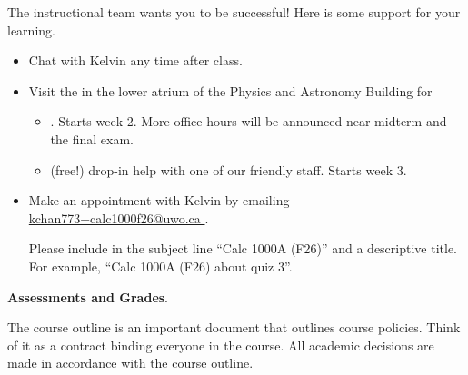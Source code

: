 \documentclass[../main.tex]{subfiles}
\begin{document}
\vfill{}

The instructional team wants you to be successful! Here is some support for your learning.
\begin{itemize}
  \item Chat with Kelvin any time after class.
  \item Visit the  in the lower atrium of the Physics and Astronomy Building for
    \begin{itemize}
      \item {}. Starts week 2. More office hours will be announced near midterm and the final exam.
      \item (free!) drop-in help with one of our friendly staff. Starts week 3.
    \end{itemize}
  \item Make an appointment with Kelvin by emailing \href{mailto:kchan773+calc1000f26@uwo.ca?subject=Calc 1000A (F26) YOUR TITLE}{\footnotesize\ttfamily\textcolor{link}{kchan773+calc1000f26@uwo.ca \faExternalLink*{}}}.

    Please include in the subject line \enquote{Calc 1000A (F26)} and a descriptive title. For example, \enquote{Calc 1000A (F26) about quiz 3}.
\end{itemize}
\clearpage

\textbf{Assessments and Grades}.

The course outline is an important document that outlines course policies. Think of it as a contract binding everyone in the course. All academic decisions are made in accordance with the course outline.
\end{document}
